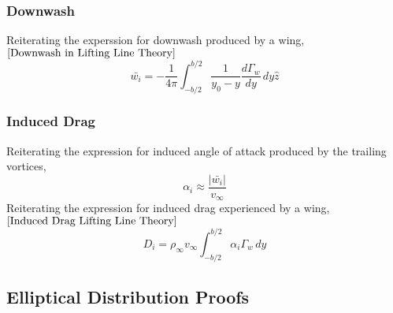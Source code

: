 \documentclass[a4paper, 12pt]{report}
\begin{document}
\begin{center}
\subsubsection{Downwash}
\begin{comment}
\end{comment}
Reiterating the experssion for downwash produced by a wing, $\ref{Downwash in Lifting Line Theory}$
$$\bar{w_{i}} = -\frac{1}{4\pi} \int^{b/2}_{-b/2}\frac{1}{y_{0}-y}\frac{d\Gamma_{w}}{dy} \,dy\hat{z}$$

\subsubsection{Induced Drag}
\begin{comment}
\end{comment}
Reiterating the expression for induced angle of attack produced by the trailing vortices, 
$$\alpha_{i} \approx \frac{|\bar{w_{i}}|}{v_{\infty}}$$
Reiterating the expression for induced drag experienced by a wing, $\ref{Induced Drag Lifting Line Theory}$
$$D_{i} = \rho_{\infty}v_{\infty}\int^{b/2}_{-b/2}\alpha_{i}\Gamma_{w}\,dy$$

\subsection{Elliptical Distribution Proofs}
\begin{comment}
\end{comment}





\end{center}
\end{document}

